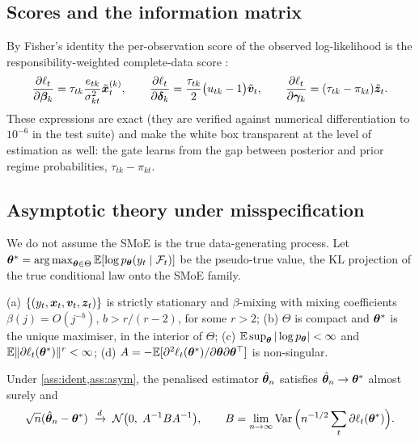 \subsection{Scores and the information matrix}

By Fisher's identity the per-observation score of the observed log-likelihood is the
responsibility-weighted complete-data score \citep{louis1982finding}:
\begin{equation}\label{eq:score}
  \frac{\partial\ell_t}{\partial\bm\beta_k}=\tau_{tk}\frac{e_{tk}}{\sigma^2_{kt}}\tilde{\bm{x}}^{(k)}_t,\qquad
  \frac{\partial\ell_t}{\partial\bm\delta_k}=\frac{\tau_{tk}}{2}\big(u_{tk}-1\big)\tilde{\bm{v}}_t,\qquad
  \frac{\partial\ell_t}{\partial\bm\gamma_k}=(\tau_{tk}-\pi_{kt})\tilde{\bm{z}}_t .
\end{equation}
These expressions are exact (they are verified against numerical differentiation to $10^{-6}$ in the
test suite) and make the white box transparent at the level of estimation as well: the gate
learns from the gap between posterior and prior regime probabilities, $\tau_{tk}-\pi_{kt}$.

\subsection{Asymptotic theory under misspecification}

We do not assume the SMoE is the true data-generating process. Let
$\bm{\theta}^\ast=\operatorname*{arg\,max}_{\bm{\theta}\in\Theta}\mathbb{E}[\log p_{\bm{\theta}}(y_t\mid\mathcal{F}_t)]$ be the pseudo-true value,
the KL projection of the true conditional law onto the SMoE family.

\begin{assumption}\label{ass:asym}
(a) $\{(y_t,\bm{x}_t,\bm{v}_t,\bm{z}_t)\}$ is strictly stationary and $\beta$-mixing with mixing coefficients
$\beta(j)=O(j^{-b})$, $b>r/(r-2)$, for some $r>2$;
(b) $\Theta$ is compact and $\bm{\theta}^\ast$ is the unique maximiser, in the interior of $\Theta$;
(c) $\mathbb{E}\sup_{\bm{\theta}}|\log p_{\bm{\theta}}|<\infty$ and $\mathbb{E}\|\partial\ell_t(\bm{\theta}^\ast)\|^{r}<\infty$;
(d) $A=-\mathbb{E}[\partial^2\ell_t(\bm{\theta}^\ast)/\partial\bm{\theta}\partial\bm{\theta}^\top]$ is non-singular.
\end{assumption}

\begin{theorem}[QMLE]\label{thm:qmle}
Under \cref{ass:ident,ass:asym}, the penalised estimator $\hat{\bm{\theta}}_n$ satisfies
$\hat{\bm{\theta}}_n\to\bm{\theta}^\ast$ almost surely and
\begin{equation}
  \sqrt n(\hat{\bm{\theta}}_n-\bm{\theta}^\ast)\;\xrightarrow{d}\;\mathcal{N}\big(0,\;A^{-1}BA^{-1}\big),\qquad
  B=\lim_{n\to\infty}\operatorname{Var}\Big(n^{-1/2}\sum_t\partial\ell_t(\bm{\theta}^\ast)\Big).
\end{equation}
\end{theorem}

